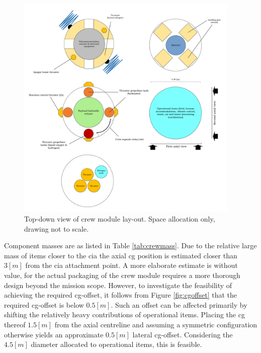 \begin{figure}[h]
		\centering
		\includegraphics[width=0.95\textwidth]{./Figure/CrewModule/TopviewV2.pdf}
		\caption[Top-down view of crew module lay-out]{Top-down view of crew module lay-out. Space allocation only, drawing not to scale.}
		\label{fig:topview}
\end{figure}

Component masses are as listed in Table \ref{tab:crewmass}. Due to the relative large mass of items closer to the \gls{cia} the axial \gls{cg} position is estimated closer than $3 \left[m\right]$ from the \gls{cia} attachment point. A more elaborate estimate is without value, for the actual packaging of the crew module requires a more thorough design beyond the mission scope. However, to investigate the feasibility of achieving the required \gls{cg}-offset, it follows from Figure \ref{fig:cgoffset} that the required \gls{cg}-offset is below $0.5 \left[m\right]$. Such an offset can be affected primarily by shifting the relatively heavy contributions of operational items. Placing the \gls{cg} thereof $1.5 \left[m\right]$ from the axial centreline and assuming a symmetric configuration otherwise yields an approximate $0.5 \left[m\right]$ lateral \gls{cg}-offset. Considering the $4.5 \left[m\right]$ diameter allocated to operational items, this is feasible. %

